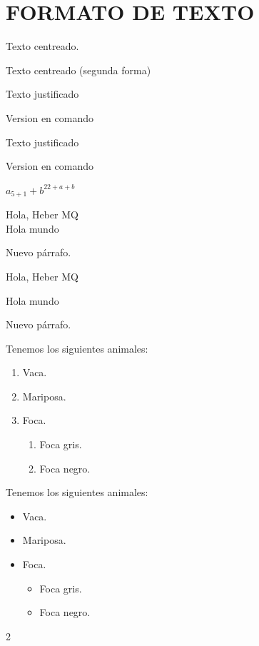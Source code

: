 \documentclass[10pt]{book}
\begin{document}
\tableofcontents




\chapter{FORMATO DE TEXTO}
\lipsum[1]


\begin{center}

Texto centreado.

\end{center}

{
\centering

Texto centreado (segunda forma)

}

\begin{flushleft}
Texto justificado
\end{flushleft}
{%
\raggedright Version en comando

}


\begin{flushright}
Texto justificado
\end{flushright}
{%
\raggedleft Version en comando

}





$a_{5 + 1} + b^{22 + a + b}$


\begingroup


\large
\bfseries\itshape
\lipsum[1]

\endgroup



Hola, Heber                 MQ\\
Hola mundo \par Nuevo párrafo.


Hola, Heber \hspace{2cm} MQ

\vspace{2cm}

Hola mundo \par Nuevo párrafo.


Tenemos los siguientes animales:
\begin{enumerate}
	\item Vaca.
	\item Mariposa.
	\item Foca.
	\begin{enumerate}
		\item Foca gris.
		\item Foca negro.
	\end{enumerate}
\end{enumerate}

Tenemos los siguientes animales:
\begin{itemize}
	\item Vaca.
	\item Mariposa.
	\item Foca.
	\begin{itemize}
		\item Foca gris.
		\item Foca negro.
	\end{itemize}
\end{itemize}


\begin{multicols}{2}

\lipsum[1-3]

\end{multicols}
\end{document}
